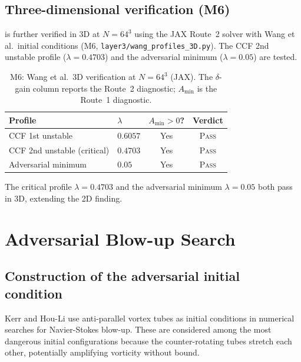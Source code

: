 \documentclass[12pt]{article}
\newcommand{\Amin}{A_{\min}}
\begin{document}
\subsection{Three-dimensional verification (M6)}
\label{ssec:lambda-3D}

 is further verified in 3D at $N = 64^3$ using the JAX
Route~2 solver with Wang et al.\ initial conditions (M6,
\texttt{layer3/wang\_profiles\_3D.py}).  The CCF 2nd unstable profile ($\lambda =
0.4703$) and the adversarial minimum ($\lambda = 0.05$) are tested.

\begin{table}[ht]
  \centering
  \caption{M6: Wang et al.\ 3D verification at $N=64^3$ (JAX). The $\delta$-gain
    column reports the Route~2 diagnostic; $\Amin$ is the Route~1 diagnostic.}
  \label{tab:wang-3D}
  \begin{tabular}{llcc}
    \toprule
    Profile & $\lambda$ & $\Amin > 0$? & Verdict \\
    \midrule
    CCF 1st unstable & $0.6057$ & Yes & \textsc{Pass} \\
    CCF 2nd unstable (critical) & $0.4703$ & Yes & \textsc{Pass} \\
    Adversarial minimum & $0.05$ & Yes & \textsc{Pass} \\
    \bottomrule
  \end{tabular}
\end{table}

The critical profile $\lambda = 0.4703$ and the adversarial minimum $\lambda =
0.05$ both pass in 3D, extending the 2D finding.

\section{Adversarial Blow-up Search}
\label{sec:blowup}

\subsection{Construction of the adversarial initial condition}
\label{ssec:blowup-ic}

Kerr \citep{Kerr1993} and Hou-Li \citep{HouLi2006} use anti-parallel vortex tubes
as initial conditions in numerical searches for Navier-Stokes blow-up.  These are
considered among the most dangerous initial configurations because the
counter-rotating tubes stretch each other, potentially amplifying vorticity without
bound.
\end{document}
